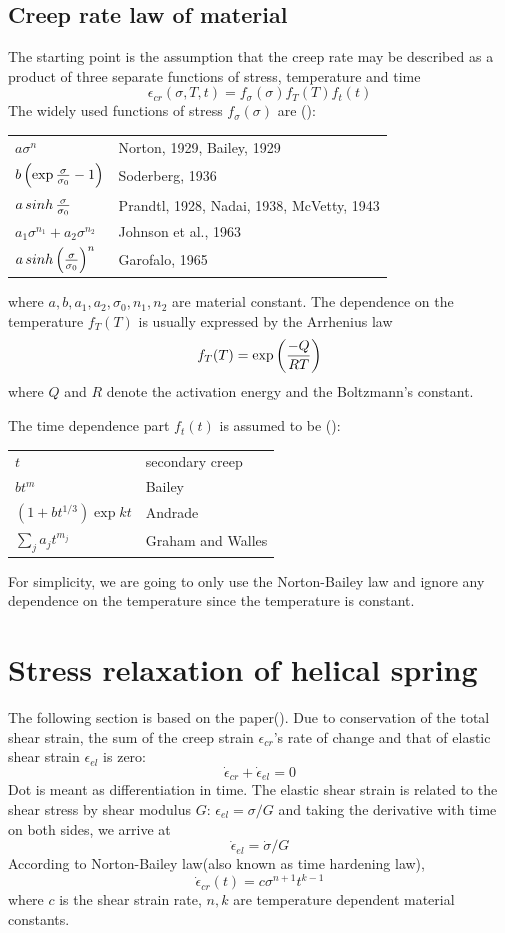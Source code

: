 \documentclass[10pt]{article}
\begin{document}
\subsection{Creep rate law of material}
\label{sec:Creep}
The starting point is the assumption that the creep rate may be described as a product of three separate functions of stress, temperature and time
\[
\epsilon_{cr}(\sigma,T,t)=f_\sigma (\sigma) f_T(T) f_t(t)
\]
The widely used functions of stress $f_\sigma(\sigma)$ are (\cite{Creep}):

\begin{tabular}{ll}
$a\sigma^n$ & Norton, 1929, Bailey, 1929 \\
$b\left( \exp{\sigma\over \sigma_0} -1 \right)$ & Soderberg, 1936 \\
$a\mathop{sinh}{\sigma\over \sigma_0}$ & Prandtl, 1928, Nadai, 1938, McVetty, 1943\\
$a_1\sigma^{n_1} + a_2 \sigma^{n_2}$ & Johnson et al., 1963 \\
$a\mathop{sinh} \left( {\sigma\over \sigma_0}\right)^n$ & Garofalo, 1965
\end{tabular}

where $a,b,a_1,a_2,\sigma_0,n_1,n_2$ are material constant. The dependence on the temperature $f_T(T)$ is usually expressed by the Arrhenius law
\[
f_T(T) = \exp \left( {-Q\over RT}\right)
\]
where $Q$ and $R$ denote the activation energy and the Boltzmann's constant.

The time dependence part $f_t(t)$ is assumed to be (\cite{Ch2000}):

\begin{tabular}{ll}
$t$ & secondary creep \\
$bt^m$ & Bailey \\
$(1+bt^{1/3})\exp{kt}$ & Andrade\\
$\sum_j a_j t^{m_j}$ & Graham and Walles
\end{tabular}

For simplicity, we are going to only use the Norton-Bailey law and ignore any dependence on the temperature since the temperature is constant.
\section{Stress relaxation of helical spring}
The following section is based on the paper(\cite{Relaxation1}). Due to conservation of the total shear strain, the sum of the creep strain $\epsilon_{cr}$'s rate of change and that of elastic shear strain $\epsilon_{el}$ is zero:
\[
\dot{\epsilon}_{cr} + \dot{\epsilon}_{el} = 0
\]
Dot is meant as differentiation in time. The elastic shear strain is related to the shear stress by shear modulus $G$: $\epsilon_{el} = \sigma/G$ and taking the derivative with time on both sides, we arrive at
\[
\dot{\epsilon}_{el} = \dot{\sigma}/G
\]
According to Norton-Bailey law(also known as time hardening law),
\begin{equation} \label{eq:N-B}
\dot{\epsilon}_{cr}(t)=c\sigma^{n+1} t^{k-1}
\end{equation}
where $c$ is the shear strain rate, $n,k$ are temperature dependent material constants.
\end{document}
